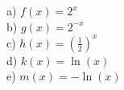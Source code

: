 \documentclass[12pt]{article}
\begin{document}
\begin{enumerate}
\begin{minipage}{0.6\textwidth}
a) $f(x)=2^x$\\

\vspace{10mm}
b) $g(x)=2^{-x}$\\

\vspace{10mm}
c) $\displaystyle h(x)=\left(\frac{1}{2}\right)^x$\\

\vspace{10mm}
d) $k(x)=\ln(x)$\\

\vspace{10mm}
e) $m(x)=-\ln(x)$
\end{minipage}


	

	
\end{enumerate}
\end{document}
